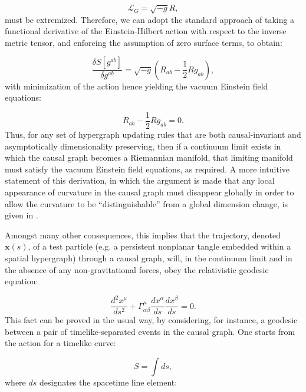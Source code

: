 \documentclass{article}
\begin{document}
\begin{equation}
\mathcal{L}_G = \sqrt{- g} R,
\end{equation}
must be extremized. Therefore, we can adopt the standard approach of taking a functional derivative of the Einstein-Hilbert action with respect to the inverse metric tensor, and enforcing the assumption of zero surface terms, to obtain:

\begin{equation}
\frac{\delta S \left[ g^{ a b} \right]}{\delta g^{a b}} = \sqrt{- g} \left( R_{a b} - \frac{1}{2} R g_{a b} \right),
\end{equation}
with minimization of the action hence yielding the vacuum Einstein field equations:

\begin{equation}
R_{a b} - \frac{1}{2} R g_{a b} = 0.
\end{equation}
Thus, for any set of hypergraph updating rules that are both causal-invariant and asymptotically dimensionality preserving, then if a continuum limit exists in which the causal graph becomes a Riemannian manifold, that limiting manifold must satisfy the vacuum Einstein field equations, as required. A more intuitive statement of this derivation, in which the argument is made that any local appearance of curvature in the causal graph must disappear globally in order to allow the curvature to be ``distinguishable'' from a global dimension change, is given in \cite{wolfram_new}.

Amongst many other consequences, this implies that the trajectory, denoted ${\mathbf{x} \left( s \right)}$, of a test particle (e.g. a persistent nonplanar tangle embedded within a spatial hypergraph) through a causal graph, will, in the continuum limit and in the absence of any non-gravitational forces, obey the relativistic geodesic equation:

\begin{equation}
\frac{d^2 x^{\mu}}{d s^2} + \Gamma_{\alpha \beta}^{\mu} \frac{d x^{\alpha}}{d s} \frac{d x^{\beta}}{d s} = 0.
\end{equation}
This fact can be proved in the usual way, by considering, for instance, a geodesic between a pair of timelike-separated events in the causal graph. One starts from the action for a timelike curve:

\begin{equation}
S = \int d s,
\end{equation}
where ${d s}$ designates the spacetime line element:
\end{document}
